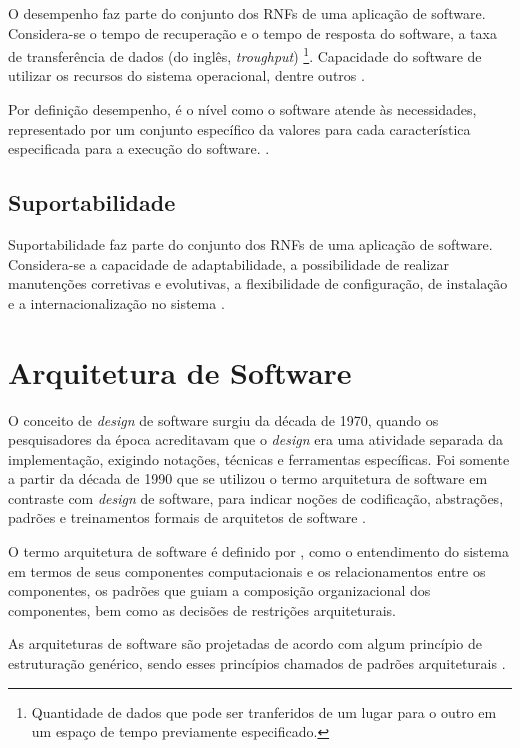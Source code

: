 O desempenho faz parte do conjunto dos RNFs de uma aplicação de software. Considera-se o tempo de recuperação e o tempo de resposta do software, a taxa de transferência de dados (do inglês, \textit{troughput}) \footnote[1]{Quantidade de dados que pode ser tranferidos de um lugar para o outro em um espaço de tempo previamente especificado.}. Capacidade do software de utilizar os recursos do sistema operacional, dentre outros \cite{cintra2006implementaccao}.

Por definição desempenho, é o nível como o software atende às necessidades, representado por um conjunto específico da valores para cada característica especificada para a execução do software. \cite{qualidadeDeProdutoNBR}.  

\subsection{Suportabilidade}
\label{subsec:suportabilidade}

Suportabilidade faz parte do conjunto dos RNFs de uma aplicação de software. Considera-se a capacidade de adaptabilidade, a possibilidade de realizar manutenções corretivas e evolutivas, a flexibilidade de configuração, de instalação e a internacionalização no sistema \cite{cintra2006implementaccao}.

\section{Arquitetura de Software}
\label{sec:arquitetura}

O conceito de \textit{design} de software surgiu da década de 1970, quando os pesquisadores da época acreditavam que o \textit{design} era uma atividade separada da implementação, exigindo notações, técnicas e ferramentas específicas. Foi somente a partir da década de 1990 que se utilizou o termo arquitetura de software em contraste com \textit{design} de software, para indicar noções de codificação, abstrações, padrões e treinamentos formais de arquitetos de software \cite{perry1992foundations}.

O termo arquitetura de software é definido por \cite{shaw1996software}, como o entendimento do sistema em termos de seus componentes computacionais e os relacionamentos entre os componentes, os padrões que guiam a composição organizacional dos componentes, bem como as decisões de restrições arquiteturais. 

As arquiteturas de software são projetadas de acordo com algum princípio de estruturação genérico, sendo esses princípios chamados de padrões arquiteturais \cite{buschmann1996system}. 

